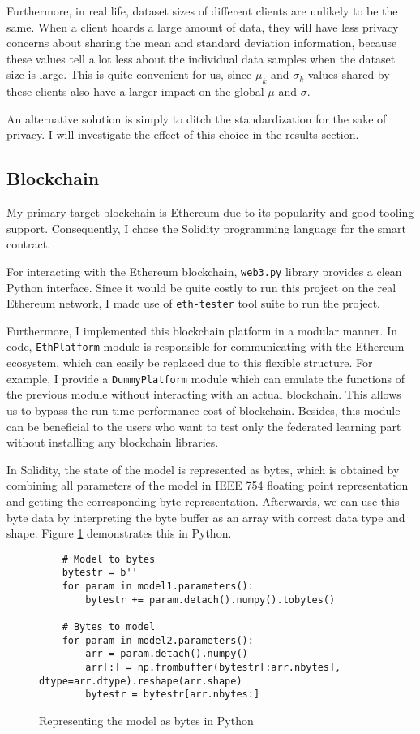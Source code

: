 Furthermore, in real life, dataset sizes of different clients are unlikely to be the same.
When a client hoards a large amount of data, they will have less privacy concerns about sharing the mean and standard deviation information, because these values tell a lot less about the individual data samples when the dataset size is large.
This is quite convenient for us, since $\mu_k$ and $\sigma_k$ values shared by these clients also have a larger impact on the global $\mu$ and $\sigma$.

An alternative solution is simply to ditch the standardization for the sake of privacy.
I will investigate the effect of this choice in the results section.


\subsection{Blockchain}

My primary target blockchain is Ethereum due to its popularity and good tooling support.
Consequently, I chose the Solidity programming language for the smart contract.

For interacting with the Ethereum blockchain, \verb|web3.py| library provides a clean Python interface.
Since it would be quite costly to run this project on the real Ethereum network, I made use of \verb|eth-tester| tool suite to run the project.

Furthermore, I implemented this blockchain platform in a modular manner.
In code, \verb|EthPlatform| module is responsible for communicating with the Ethereum ecosystem, which can easily be replaced due to this flexible structure.
For example, I provide a \verb|DummyPlatform| module which can emulate the functions of the previous module without interacting with an actual blockchain.
This allows us to bypass the run-time performance cost of blockchain.
Besides, this module can be beneficial to the users who want to test only the federated learning part without installing any blockchain libraries.

In Solidity, the state of the model is represented as bytes, which is obtained by combining all parameters of the model in IEEE 754 floating point representation and getting the corresponding byte representation.
Afterwards, we can use this byte data by interpreting the byte buffer as an array with correst data type and shape.
Figure \ref{fig:modelBytes} demonstrates this in Python.

\begin{figure}[h]
    \begin{verbatim}
    # Model to bytes
    bytestr = b''
    for param in model1.parameters():
        bytestr += param.detach().numpy().tobytes()
    
    # Bytes to model
    for param in model2.parameters():
        arr = param.detach().numpy()
        arr[:] = np.frombuffer(bytestr[:arr.nbytes], dtype=arr.dtype).reshape(arr.shape)
        bytestr = bytestr[arr.nbytes:]
    \end{verbatim}
    \caption{Representing the model as bytes in Python}
    \label{fig:modelBytes}
\end{figure}


